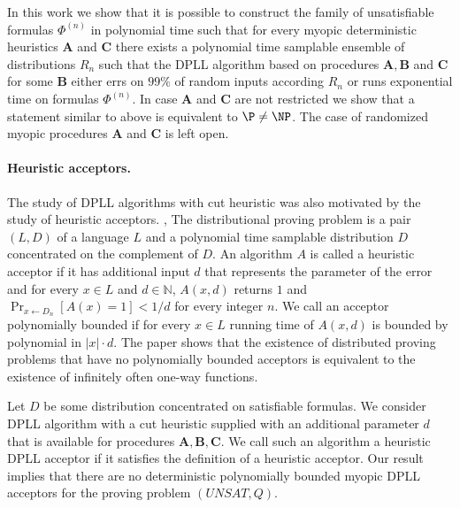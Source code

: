 In this work we show that it is possible to construct the family of
unsatisfiable formulas $\Phi^{(n)}$ in polynomial time such that for
every myopic deterministic heuristics $\mathbf{A}$ and $\mathbf{C}$
there exists a polynomial time samplable ensemble of distributions
$R_n$ such that the DPLL algorithm based on procedures $\mathbf{A, B}$
and $\mathbf{C}$ for some $\mathbf{B}$ either errs on $99\%$ of random
inputs according $R_n$ or runs exponential time on formulas
$\Phi^{(n)}$.  In case $\mathbf{A}$ and $\mathbf{C}$ are not
restricted we show that a statement similar to above is equivalent to
$\P \neq \NP$.  The case of randomized myopic procedures $\mathbf{A}$
and $\mathbf{C}$ is left open.


\paragraph{Heuristic acceptors.}  The study of DPLL algorithms with
cut heuristic was also motivated by the study of heuristic acceptors.
\cite{HI10}, \cite{HIMS10}
The distributional proving problem is a pair $(L, D)$ of a language
$L$ and a polynomial time samplable distribution $D$ concentrated on
the complement of $D$. An algorithm $A$ is called a heuristic acceptor
if it has additional input $d$ that represents the parameter of the
error and for every $x \in L$ and $d \in \mathbb{N}$, $A(x, d)$
returns $1$ and $\Pr_{x\gets D_n}[A(x) = 1] < 1/d$ for every integer
$n$.  We call an acceptor polynomially bounded if for every $x \in L$
running time of $A(x, d)$ is bounded by polynomial in $|x| \cdot d$.
The paper \cite{HIMS10} shows that the existence of distributed proving
problems that have no polynomially bounded acceptors is equivalent to
the existence of infinitely often one-way functions.

Let $D$ be some distribution concentrated on satisfiable formulas. We
consider DPLL algorithm with a cut heuristic supplied with an
additional parameter $d$ that is available for procedures $\mathbf{A,
B, C}$. We call such an algorithm a heuristic DPLL acceptor if it
satisfies the definition of a heuristic acceptor. Our result implies
that there are no deterministic polynomially bounded myopic DPLL
acceptors for the proving problem $(UNSAT, Q)$.